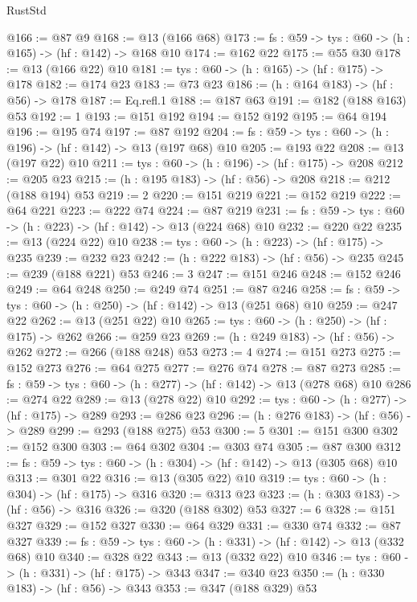 \begin{lexlean}{RustStd}
\begin{coremodule}
@166 := @87 @9
@168 := @13 (@166 @68)
@173 := {fs : @59} -> {tys : @60} -> (h : @165) -> (hf : @142) -> @168 @10
@174 := @162 @22
@175 := @55 @30
@178 := @13 (@166 @22) @10
@181 := {tys : @60} -> (h : @165) -> (hf : @175) -> @178
@182 := @174 @23
@183 := @73 @23
@186 := (h : @164 @183) -> (hf : @56) -> @178
@187 := Eq.refl.{1}
@188 := @187 @63
@191 := @182 (@188 @163) @53
@192 := 1
@193 := @151 @192
@194 := @152 @192
@195 := @64 @194
@196 := @195 @74
@197 := @87 @192
@204 := {fs : @59} -> {tys : @60} -> (h : @196) -> (hf : @142) -> @13 (@197 @68) @10
@205 := @193 @22
@208 := @13 (@197 @22) @10
@211 := {tys : @60} -> (h : @196) -> (hf : @175) -> @208
@212 := @205 @23
@215 := (h : @195 @183) -> (hf : @56) -> @208
@218 := @212 (@188 @194) @53
@219 := 2
@220 := @151 @219
@221 := @152 @219
@222 := @64 @221
@223 := @222 @74
@224 := @87 @219
@231 := {fs : @59} -> {tys : @60} -> (h : @223) -> (hf : @142) -> @13 (@224 @68) @10
@232 := @220 @22
@235 := @13 (@224 @22) @10
@238 := {tys : @60} -> (h : @223) -> (hf : @175) -> @235
@239 := @232 @23
@242 := (h : @222 @183) -> (hf : @56) -> @235
@245 := @239 (@188 @221) @53
@246 := 3
@247 := @151 @246
@248 := @152 @246
@249 := @64 @248
@250 := @249 @74
@251 := @87 @246
@258 := {fs : @59} -> {tys : @60} -> (h : @250) -> (hf : @142) -> @13 (@251 @68) @10
@259 := @247 @22
@262 := @13 (@251 @22) @10
@265 := {tys : @60} -> (h : @250) -> (hf : @175) -> @262
@266 := @259 @23
@269 := (h : @249 @183) -> (hf : @56) -> @262
@272 := @266 (@188 @248) @53
@273 := 4
@274 := @151 @273
@275 := @152 @273
@276 := @64 @275
@277 := @276 @74
@278 := @87 @273
@285 := {fs : @59} -> {tys : @60} -> (h : @277) -> (hf : @142) -> @13 (@278 @68) @10
@286 := @274 @22
@289 := @13 (@278 @22) @10
@292 := {tys : @60} -> (h : @277) -> (hf : @175) -> @289
@293 := @286 @23
@296 := (h : @276 @183) -> (hf : @56) -> @289
@299 := @293 (@188 @275) @53
@300 := 5
@301 := @151 @300
@302 := @152 @300
@303 := @64 @302
@304 := @303 @74
@305 := @87 @300
@312 := {fs : @59} -> {tys : @60} -> (h : @304) -> (hf : @142) -> @13 (@305 @68) @10
@313 := @301 @22
@316 := @13 (@305 @22) @10
@319 := {tys : @60} -> (h : @304) -> (hf : @175) -> @316
@320 := @313 @23
@323 := (h : @303 @183) -> (hf : @56) -> @316
@326 := @320 (@188 @302) @53
@327 := 6
@328 := @151 @327
@329 := @152 @327
@330 := @64 @329
@331 := @330 @74
@332 := @87 @327
@339 := {fs : @59} -> {tys : @60} -> (h : @331) -> (hf : @142) -> @13 (@332 @68) @10
@340 := @328 @22
@343 := @13 (@332 @22) @10
@346 := {tys : @60} -> (h : @331) -> (hf : @175) -> @343
@347 := @340 @23
@350 := (h : @330 @183) -> (hf : @56) -> @343
@353 := @347 (@188 @329) @53

\end{coremodule}
\end{lexlean}

